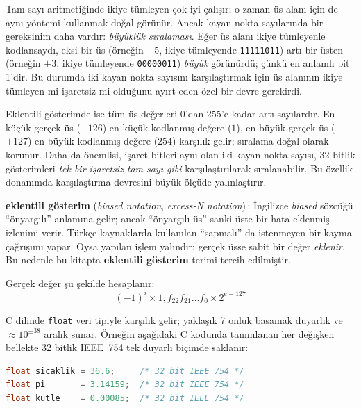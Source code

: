 \begin{bilginot}
Tam sayı aritmetiğinde ikiye tümleyen çok iyi çalışır; o zaman üs alanı için de aynı yöntemi kullanmak doğal görünür. Ancak kayan nokta sayılarında bir gereksinim daha vardır: \emph{büyüklük sıralaması}. Eğer üs alanı ikiye tümleyenle kodlansaydı, eksi bir üs (örneğin $-5$, ikiye tümleyende \texttt{11111011}) artı bir üsten (örneğin $+3$, ikiye tümleyende \texttt{00000011}) \emph{büyük} görünürdü; çünkü en anlamlı bit 1'dir. Bu durumda iki kayan nokta sayısını karşılaştırmak için üs alanının ikiye tümleyen mi işaretsiz mi olduğunu ayırt eden özel bir devre gerekirdi.

Eklentili gösterimde ise tüm üs değerleri 0'dan 255'e kadar artı sayılardır. En küçük gerçek üs ($-126$) en küçük kodlanmış değere ($1$), en büyük gerçek üs ($+127$) en büyük kodlanmış değere ($254$) karşılık gelir; sıralama doğal olarak korunur. Daha da önemlisi, işaret bitleri aynı olan iki kayan nokta sayısı, 32 bitlik gösterimleri \emph{tek bir işaretsiz tam sayı gibi} karşılaştırılarak sıralanabilir. Bu özellik donanımda karşılaştırma devresini büyük ölçüde yalınlaştırır.

\end{bilginot}

\begin{terimnotu}
\textbf{eklentili gösterim} (\emph{biased notation}, \emph{excess-N notation})\,: İngilizce \emph{biased} sözcüğü ``önyargılı'' anlamına gelir; ancak ``önyargılı üs'' sanki üste bir hata eklenmiş izlenimi verir. Türkçe kaynaklarda kullanılan ``sapmalı'' da istenmeyen bir kayma çağrışımı yapar. Oysa yapılan işlem yalındır: gerçek üsse sabit bir değer \emph{eklenir}. Bu nedenle bu kitapta \textbf{eklentili gösterim} terimi tercih edilmiştir.
\end{terimnotu}

Gerçek değer şu şekilde hesaplanır:
\[
  (-1)^{i} \times 1{,}f_{22}f_{21}\ldots f_0 \times 2^{e - 127}
\]

C dilinde \texttt{float} veri tipiyle karşılık gelir; yaklaşık 7 onluk basamak duyarlık ve $\approx 10^{\pm 38}$ aralık sunar. Örneğin aşağıdaki C kodunda tanımlanan her değişken bellekte 32 bitlik IEEE~754 tek duyarlı biçimde saklanır:

\begin{lstlisting}[language=C, xleftmargin=2em]
float sicaklik = 36.6;     /* 32 bit IEEE 754 */
float pi       = 3.14159;  /* 32 bit IEEE 754 */
float kutle    = 0.00085;  /* 32 bit IEEE 754 */
\end{lstlisting}

